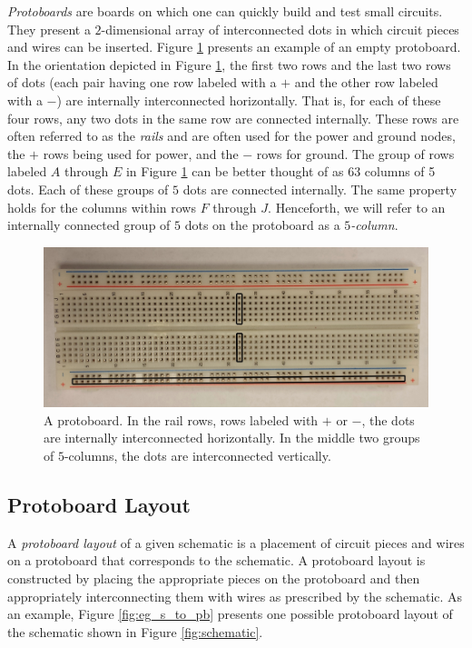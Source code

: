 \textit{Protoboards} are boards on which one can quickly build and test
small circuits. They present a $2$-dimensional array of interconnected dots
in which circuit pieces and wires can be inserted. Figure
\ref{fig:physical_protoboard} presents an example of an empty
protoboard.
In the orientation depicted in Figure \ref{fig:physical_protoboard}, the first
two rows and the last two rows of dots (each pair having one row labeled with a
$+$ and the other row labeled with a $-$) are internally interconnected
horizontally. That
is, for each of these four rows, any two dots in the same row are connected
internally.
These rows are often referred to as the \emph{rails} and are often used for the
power and ground nodes, the $+$ rows being used for power, and the $-$ rows for
ground.
The group of rows labeled $A$ through $E$ in Figure \ref{fig:physical_protoboard}
can be better thought of as $63$ columns of 5 dots. Each of these groups of $5$
dots are connected internally. The same property holds for the columns within
rows $F$ through $J$. Henceforth, we will refer to an internally connected
group of $5$ dots on the protoboard as a \emph{$5$-column}.

\begin{figure}
\begin{center}
\includegraphics[width=\textwidth]{Images/physical_protoboard.jpg}
\caption[Protoboard]{A protoboard. In the rail rows, rows labeled with $+$ or
$-$, the dots are internally interconnected horizontally. In the middle two
groups of $5$-columns, the dots are interconnected vertically.}
\label{fig:physical_protoboard}
\end{center}
\end{figure}

\subsection{Protoboard Layout}
\label{sec:pb_layout}

A \textit{protoboard layout} of a given schematic is a placement of
circuit pieces
and wires on a protoboard that corresponds to the schematic. A protoboard layout
is constructed by
placing the appropriate pieces on the protoboard and then appropriately
interconnecting them with wires as prescribed by the schematic. As an example,
Figure \ref{fig:eg_s_to_pb} presents one possible protoboard layout
of the schematic shown in Figure \ref{fig:schematic}.

